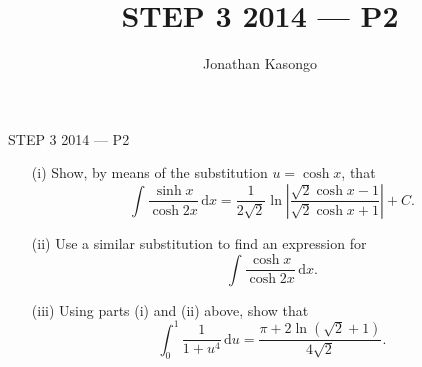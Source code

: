 \documentclass{article}
\author{Jonathan Kasongo}
\title{STEP 3 2014 --- P2}
\begin{document}
\maketitle

\begin{problem}{STEP 3 2014 --- P2}
\begin{enumerate}
\item[(i)] Show, by means of the substitution \( u = \cosh x \), that
\[
\int \frac{\sinh x}{\cosh 2x} \, \text{d}x = \frac{1}{2\sqrt{2}} \ln \left| \frac{\sqrt{2} \cosh x - 1}{\sqrt{2} \cosh x + 1} \right| + C.
\]

\item[(ii)] Use a similar substitution to find an expression for
\[
\int \frac{\cosh x}{\cosh 2x} \, \text{d}x.
\]

\item[(iii)] Using parts (i) and (ii) above, show that
\[
\int_0^1 \frac{1}{1 + u^4} \, \text{d}u = \frac{\pi + 2 \ln\left(\sqrt{2} + 1\right)}{4 \sqrt{2}}.
\]
\end{enumerate}
\end{problem}
\end{document}
